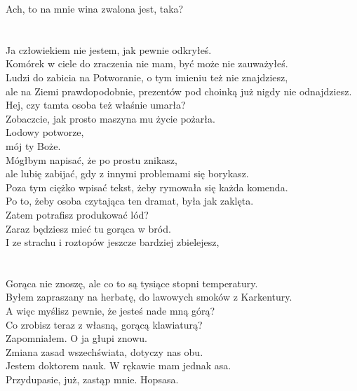 \chardok{}
Ach, to na mnie wina zwalona jest, taka?\\
\\

\\

\charmik{}
Ja człowiekiem nie jestem, jak pewnie odkryłeś.\\
Komórek w ciele do zraczenia nie mam, być może nie zauważyłeś.\\
Ludzi do zabicia na Potworanie, o tym imieniu też nie znajdziesz,\\
ale na Ziemi prawdopodobnie, prezentów pod choinką już nigdy nie odnajdziesz.\\
Hej, czy tamta osoba też właśnie umarła?\\
Zobaczcie, jak prosto maszyna mu życie pożarła.\\

\chardok{}
Lodowy potworze,\\
mój ty Boże.\\
Mógłbym napisać, że po prostu znikasz, \\
ale lubię zabijać, gdy z innymi problemami się borykasz.\\
Poza tym ciężko wpisać tekst, żeby rymowała się każda komenda.\\
Po to, żeby osoba czytająca ten dramat, była jak zaklęta.\\
Zatem potrafisz produkować lód?\\
Zaraz będziesz mieć tu gorąca w bród.\\
I ze strachu i roztopów jeszcze bardziej zbielejesz,\\
\\

\\

\charmik{}
Gorąca nie znoszę, ale co to są tysiące stopni temperatury.\\
Byłem zapraszany na herbatę, do lawowych smoków z Karkentury.\\
A więc myślisz pewnie, że jesteś nade mną górą?\\
Co zrobisz teraz z własną, gorącą klawiaturą?\\

\chardok{}
Zapomniałem. O ja głupi znowu.\\
Zmiana zasad wszechświata, dotyczy nas obu.\\
Jestem doktorem nauk. W rękawie mam jednak asa.\\
Przydupasie, już, zastąp mnie. Hopsasa.\\

